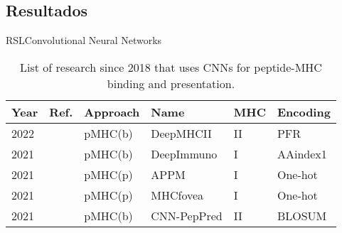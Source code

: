 \documentclass[10pt]{beamer}
\newcommand{\1}{
	\setbeamertemplate{background}{
		\texttt{[image: img/1]}
		\tikz[overlay] \fill[fill opacity=0.75,fill=white] (0,0) rectangle (-\paperwidth,\paperheight);
	}
}
\begin{document}
\subsection{Resultados}
\begin{frame}{RSL}{Convolutional Neural Networks}
	
	\fontsize{8pt}{5pt}\selectfont
	
	\begin{table}[]
		\centering
		\caption{List of research since 2018 that uses CNNs for peptide-MHC binding and presentation.}
		\setlength{\tabcolsep}{0.5em} %
		{\renewcommand{\arraystretch}{2}%
			\begin{tabular}{p{0.6cm}p{0.6cm}p{1.5cm}p{2cm}p{0.6cm}p{2.7cm}}
				\textbf{Year} & \textbf{Ref.}                              & \textbf{Approach}        & \textbf{Name} & \textbf{MHC} & \textbf{Encoding}                                                                                                                                                                                   \\ \hline
				
				2022 &	\cite{you2022deepmhcii}	& pMHC(b) &	DeepMHCII &	 II &	PFR \\
				
				2021          & \cite{li2021deepimmuno}   & pMHC(b)      & DeepImmuno    &  I        & AAindex1                                                \\
				2021          & \cite{lang2021neofox}     & pMHC(p) & APPM          &  I        & One-hot                                                                          \\
				2021          & \cite{lee2021connecting}  & pMHC(p) & MHCfovea      &  I        & One-hot                                                                                                      \\
				2021          & \cite{junet2021cnn}       & pMHC(b)      & CNN-PepPred   &  II       & BLOSUM     \\
				

\end{tabular}}
\end{table}
\end{frame}
\end{document}
